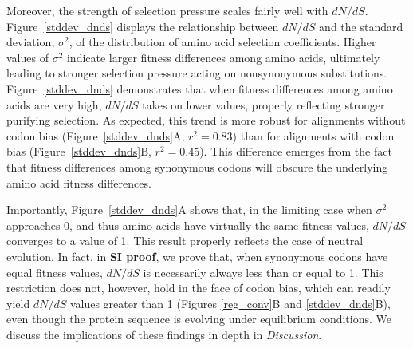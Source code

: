 \documentclass[11pt]{article}
\begin{document}
Moreover, the strength of selection pressure scales fairly well with $dN/dS$. Figure~\ref{stddev_dnds} displays the relationship between $dN/dS$ and the standard deviation, $\sigma^2$, of the distribution of amino acid selection coefficients. Higher values of $\sigma^2$ indicate larger fitness differences among amino acids, ultimately leading to stronger selection pressure acting on nonsynonymous substitutions. Figure~\ref{stddev_dnds} demonstrates that when fitness differences among amino acids are very high, $dN/dS$ takes on lower values, properly reflecting stronger purifying selection. As expected, this trend is more robust for alignments without codon bias (Figure~\ref{stddev_dnds}A, $r^2 = 0.83$) than for alignments with codon bias (Figure~\ref{stddev_dnds}B, $r^2 = 0.45$). This difference emerges from the fact that fitness differences among synonymous codons will obscure the underlying amino acid fitness differences.

Importantly, Figure~\ref{stddev_dnds}A shows that, in the limiting case when $\sigma^2$ approaches 0, and thus amino acids have virtually the same fitness values, $dN/dS$ converges to a value of 1. This result properly reflects the case of neutral evolution. In fact, in \textbf{SI proof}, we prove that, when synonymous codons have equal fitness values, $dN/dS$ is necessarily always less than or equal to 1. This restriction does not, however, hold in the face of codon bias, which can readily yield $dN/dS$ values greater than 1 (Figures \ref{reg_conv}B and \ref{stddev_dnds}B), even though the protein sequence is evolving under equilibrium conditions. We discuss the implications of these findings in depth in \textit{Discussion}.
\end{document}
